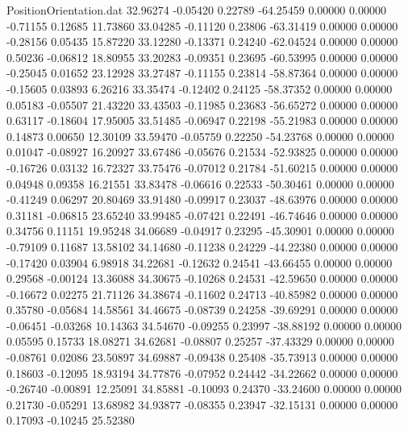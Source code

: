 \begin{filecontents}{PositionOrientation.dat}
  32.96274   -0.05420    0.22789   -64.25459    0.00000    0.00000   -0.71155    0.12685   11.73860
  33.04285   -0.11120    0.23806   -63.31419    0.00000    0.00000   -0.28156    0.05435   15.87220
  33.12280   -0.13371    0.24240   -62.04524    0.00000    0.00000    0.50236   -0.06812   18.80955
  33.20283   -0.09351    0.23695   -60.53995    0.00000    0.00000   -0.25045    0.01652   23.12928
  33.27487   -0.11155    0.23814   -58.87364    0.00000    0.00000   -0.15605    0.03893    6.26216
  33.35474   -0.12402    0.24125   -58.37352    0.00000    0.00000    0.05183   -0.05507   21.43220
  33.43503   -0.11985    0.23683   -56.65272    0.00000    0.00000    0.63117   -0.18604   17.95005
  33.51485   -0.06947    0.22198   -55.21983    0.00000    0.00000    0.14873    0.00650   12.30109
  33.59470   -0.05759    0.22250   -54.23768    0.00000    0.00000    0.01047   -0.08927   16.20927
  33.67486   -0.05676    0.21534   -52.93825    0.00000    0.00000   -0.16726    0.03132   16.72327
  33.75476   -0.07012    0.21784   -51.60215    0.00000    0.00000    0.04948    0.09358   16.21551
  33.83478   -0.06616    0.22533   -50.30461    0.00000    0.00000   -0.41249    0.06297   20.80469
  33.91480   -0.09917    0.23037   -48.63976    0.00000    0.00000    0.31181   -0.06815   23.65240
  33.99485   -0.07421    0.22491   -46.74646    0.00000    0.00000    0.34756    0.11151   19.95248
  34.06689   -0.04917    0.23295   -45.30901    0.00000    0.00000   -0.79109    0.11687   13.58102
  34.14680   -0.11238    0.24229   -44.22380    0.00000    0.00000   -0.17420    0.03904    6.98918
  34.22681   -0.12632    0.24541   -43.66455    0.00000    0.00000    0.29568   -0.00124   13.36088
  34.30675   -0.10268    0.24531   -42.59650    0.00000    0.00000   -0.16672    0.02275   21.71126
  34.38674   -0.11602    0.24713   -40.85982    0.00000    0.00000    0.35780   -0.05684   14.58561
  34.46675   -0.08739    0.24258   -39.69291    0.00000    0.00000   -0.06451   -0.03268   10.14363
  34.54670   -0.09255    0.23997   -38.88192    0.00000    0.00000    0.05595    0.15733   18.08271
  34.62681   -0.08807    0.25257   -37.43329    0.00000    0.00000   -0.08761    0.02086   23.50897
  34.69887   -0.09438    0.25408   -35.73913    0.00000    0.00000    0.18603   -0.12095   18.93194
  34.77876   -0.07952    0.24442   -34.22662    0.00000    0.00000   -0.26740   -0.00891   12.25091
  34.85881   -0.10093    0.24370   -33.24600    0.00000    0.00000    0.21730   -0.05291   13.68982
  34.93877   -0.08355    0.23947   -32.15131    0.00000    0.00000    0.17093   -0.10245   25.52380

\end{filecontents}
